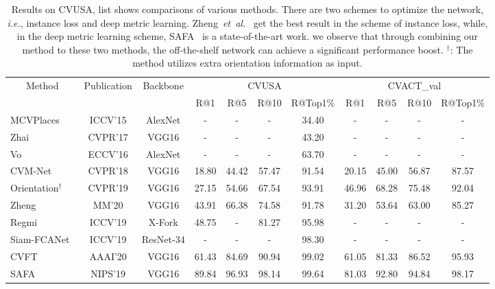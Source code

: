 \documentclass[journal]{IEEEtran}
\def\ie{\emph{i.e.}}
\def\etal{\emph{et~al.}}
\begin{document}
\begin{table*}[htp]
\setlength{\tabcolsep}{7pt}
\centering
\small
\caption{
Results on CVUSA, list shows comparisons of various methods. There are two schemes to optimize the network, \ie, instance loss and deep metric learning. Zheng~\etal~\cite{zheng_university-1652_nodate} get the best result in the scheme of instance loss, while, in the deep metric learning scheme, SAFA~\cite{shi_spatial-aware_nodate} is a state-of-the-art work. we observe that through combining our method to these two methods, the off-the-shelf network can achieve a significant performance boost. $^\dag$: The method utilizes extra orientation information as input.
}
\begin{tabular}{l|c|c|cccc|cccc}
\hline
\multicolumn{1}{c|}{\multirow{2}{*}{Method}} & \multirow{2}{*}{Publication} & \multirow{2}{*}{Backbone} & \multicolumn{4}{c|}{CVUSA} & \multicolumn{4}{c}{CVACT\_val}\\ 
\cline{4-11}
                                        & & & R@1 & R@5 & R@10 & R@Top1\% & R@1 & R@5 & R@10 & R@Top1\% \\
\shline
MCVPlaces~\cite{workman_wide-area_2015} & ICCV'15 & AlexNet & - & - & - & 34.40 & - & - & - & - \\
Zhai~\cite{zhai_predicting_2017} & CVPR'17 & VGG16 & - & - & - & 43.20 & - & - & - & -\\
Vo~\cite{vo_localizing_2017}    & ECCV'16 & AlexNet & - & - & - & 63.70 & - & - & - & -\\
CVM-Net~\cite{hu_cvm-net_2018} & CVPR'18 & VGG16 & 18.80 & 44.42 & 57.47 & 91.54 & 20.15 & 45.00 & 56.87 & 87.57\\
Orientation$^\dag$~\cite{liu_lending_2019}   & CVPR'19 & VGG16 & 27.15 & 54.66 & 67.54 & 93.91 & 46.96 & 68.28 & 75.48 & 92.04\\
Zheng~\cite{zheng_university-1652_nodate} & MM'20 & VGG16 & 43.91 & 66.38 & 74.58 & 91.78 & 31.20 & 53.64 & 63.00 & 85.27\\
Regmi~\cite{Regmi_2019_ICCV} & ICCV'19 & X-Fork & 48.75 & - & 81.27 & 95.98 & - & - & - & -\\
Siam-FCANet~\cite{Siam-FCANet} & ICCV'19 & ResNet-34 & - & - & - & 98.30 & - & - & - & -\\
CVFT~\cite{shi_optimal_nodate} & AAAI'20 & VGG16 & 61.43 & 84.69 & 90.94 & 99.02 & 61.05 & 81.33 & 86.52 & 95.93\\
SAFA~\cite{shi_spatial-aware_nodate} & NIPS'19 & VGG16 & 89.84 & 96.93 & 98.14 & 99.64 & 81.03 & 92.80 & 94.84 & 98.17\\

\end{tabular}
\end{table*}
\end{document}

